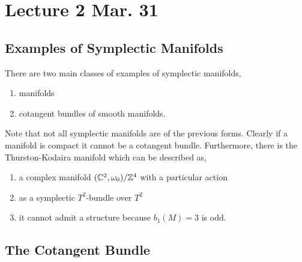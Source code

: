 \documentclass[12pt]{article}
\begin{document}
\section{Lecture 2 Mar. 31}

\subsection{Examples of Symplectic Manifolds}

There are two main classes of examples of symplectic manifolds,
\begin{enumerate}
\item \kahler manifolds
\item cotangent bundles of smooth manifolds.
\end{enumerate}

\begin{rmk}
Note that not all symplectic manifolds are of the previous forms. Clearly if a manifold is compact it cannot be a cotangent bundle. Furthermore, there is the Thurston-Kodaira manifold which can be described as,
\begin{enumerate}
\item a complex manifold $(\mathbb{C}^2, \omega_0) / \mathbb{Z}^4$ with a particular action
\item as a symplectic $T^2$-bundle over  $T^2$
\item it cannot admit a \kahler structure because $b_1(M) = 3$ is odd. 
\end{enumerate}
\end{rmk}

\subsection{The Cotangent Bundle}
\end{document}
